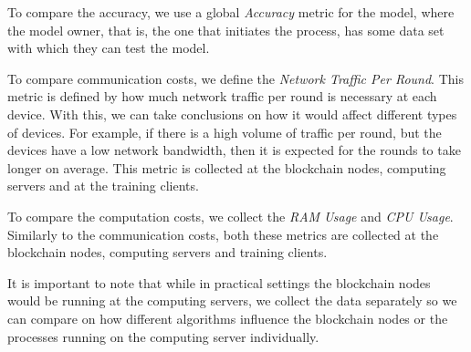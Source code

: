 To compare the accuracy, we use a global \textit{Accuracy} metric for the model, where the model owner, that is, the one that initiates the process, has some data set with which they can test the model.

To compare communication costs, we define the \textit{Network Traffic Per Round}. This metric is defined by how much network traffic per round is necessary at each device. With this, we can take conclusions on how it would affect different types of devices. For example, if there is a high volume of traffic per round, but the devices have a low network bandwidth, then it is expected for the rounds to take longer on average. This metric is collected at the blockchain nodes, computing servers and at the training clients.

To compare the computation costs, we collect the \textit{RAM Usage} and \textit{CPU Usage}. Similarly to the communication costs, both these metrics are collected at the blockchain nodes, computing servers and training clients.

It is important to note that while in practical settings the blockchain nodes would be running at the computing servers, we collect the data separately so we can compare on how different algorithms influence the blockchain nodes or the processes running on the computing server individually.
